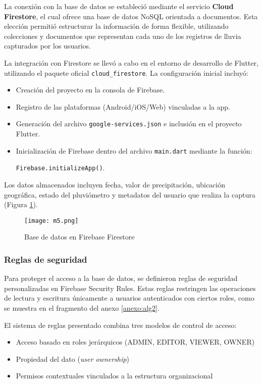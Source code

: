 La conexión con la base de datos se estableció mediante el servicio \textbf{Cloud Firestore}, el cual ofrece una base de datos NoSQL orientada a documentos. Esta elección permitió estructurar la información de forma flexible, utilizando colecciones y documentos que representan cada uno de los registros de lluvia capturados por los usuarios.

La integración con Firestore se llevó a cabo en el entorno de desarrollo de Flutter, utilizando el paquete oficial \texttt{cloud\_firestore}. La configuración inicial incluyó:

\begin{itemize}
    \item Creación del proyecto en la consola de Firebase.
    \item Registro de las plataformas (Android/iOS/Web) vinculadas a la app.
    \item Generación del archivo \texttt{google-services.json} e inclusión en el proyecto Flutter.
    \item Inicialización de Firebase dentro del archivo \texttt{main.dart} mediante la función:
    
    \texttt{Firebase.initializeApp()}.
\end{itemize}

Los datos almacenados incluyen fecha, valor de precipitación, ubicación geográfica, estado del pluviómetro y metadatos del usuario que realiza la captura (Figura \ref{m5}).

\begin{figure}[h!]
\centering
  \texttt{[image: m5.png]}
  \caption{Base de datos en Firebase Firestore}
  \label{m5}
\end{figure}

\newpage
\subsubsection*{Reglas de seguridad}

Para proteger el acceso a la base de datos, se definieron reglas de seguridad personalizadas en Firebase Security Rules. Estas reglas restringen las operaciones de lectura y escritura únicamente a usuarios autenticados con ciertos roles, como se muestra en el fragmento del anexo \ref{anexo:alg2}.


El sistema de reglas presentado combina tres modelos de control de acceso:

\begin{itemize}
\item Acceso basado en roles jerárquicos (ADMIN, EDITOR, VIEWER, OWNER)
\item Propiedad del dato (\textit{user ownership})
\item Permisos contextuales vinculados a la estructura organizacional
\end{itemize}



